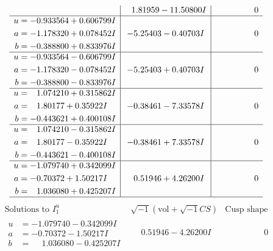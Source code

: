 \documentclass[1p]{elsarticle_modified}
\theoremstyle{definition}
\newcommand{\I}{\sqrt{-1}}
\begin{document}
$$\begin{array}{c|c|c}
 & \phantom{-}1.81959 - 11.50800 I & \phantom{-0.000000 } 0 \\ \hline\begin{aligned}
u &= -0.933564 + 0.606799 I \\
a &= -1.178320 + 0.078452 I \\
b &= -0.388800 + 0.833976 I\end{aligned}
 & -5.25403 - 0.40703 I & \phantom{-0.000000 } 0 \\ \hline\begin{aligned}
u &= -0.933564 - 0.606799 I \\
a &= -1.178320 - 0.078452 I \\
b &= -0.388800 - 0.833976 I\end{aligned}
 & -5.25403 + 0.40703 I & \phantom{-0.000000 } 0 \\ \hline\begin{aligned}
u &= \phantom{-}1.074210 + 0.315862 I \\
a &= \phantom{-}1.80177 + 0.35922 I \\
b &= -0.443621 + 0.400108 I\end{aligned}
 & -0.38461 - 7.33578 I & \phantom{-0.000000 } 0 \\ \hline\begin{aligned}
u &= \phantom{-}1.074210 - 0.315862 I \\
a &= \phantom{-}1.80177 - 0.35922 I \\
b &= -0.443621 - 0.400108 I\end{aligned}
 & -0.38461 + 7.33578 I & \phantom{-0.000000 } 0 \\ \hline\begin{aligned}
u &= -1.079740 + 0.342099 I \\
a &= -0.70372 + 1.50217 I \\
b &= \phantom{-}1.036080 + 0.425207 I\end{aligned}
 & \phantom{-}0.51946 + 4.26200 I & \phantom{-0.000000 } 0\\
 \hline 
 \end{array}$$\newpage$$\begin{array}{c|c|c}  
\text{Solutions to }I^u_{1}& \I (\text{vol} + \sqrt{-1}CS) & \text{Cusp shape}\\
 \hline 
\begin{aligned}
u &= -1.079740 - 0.342099 I \\
a &= -0.70372 - 1.50217 I \\
b &= \phantom{-}1.036080 - 0.425207 I\end{aligned}
 & \phantom{-}0.51946 - 4.26200 I & \phantom{-0.000000 } 0 \\ \hline\begin{aligned}

\end{aligned}
\end{array}$$
\end{document}
